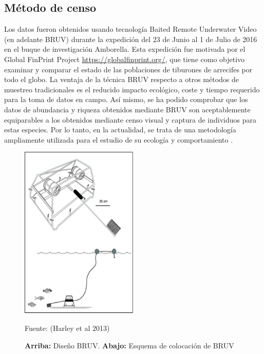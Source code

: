 \documentclass[a4paper, 11pt]{article}
\begin{document}
\subsection{Método de censo}
Los datos fueron obtenidos usando tecnología Baited Remote Underwater Video (en adelante BRUV) durante la expedición del 23 de Junio al 1 de Julio de 2016 en el buque de investigación Amborella. Esta expedición fue motivada por el Global FinPrint Project \url{https://globalfinprint.org/}, que tiene como objetivo examinar y comparar el estado de las poblaciones de tiburones de arrecifes por todo el globo. La ventaja de la técnica BRUV respecto a otros métodos de muestreo tradicionales es el reducido impacto ecológico, coste y tiempo requerido para la toma de datos en campo.  Así mismo, se ha podido comprobar que los datos de abundancia y riqueza obtenidos mediante BRUV son aceptablemente equiparables a los obtenidos mediante censo visual y captura de individuos para estas especies. Por lo tanto, en la actualidad, se trata de una metodología ampliamente utilizada para el estudio de su ecología y comportamiento \cite{Juhel2018, Kempster2016 Speed2018}.
\begin{figure}
    \centering
    \includegraphics[width=0.5\textwidth]{BRUV.png}
    \caption{\textbf{Arriba: }Diseño BRUV. \textbf{Abajo: }Esquema de colocación de BRUV}{{\footnotesize Fuente: (Harley et al 2013)}}
    \label{fig:2}
\end{figure}
\end{document}

